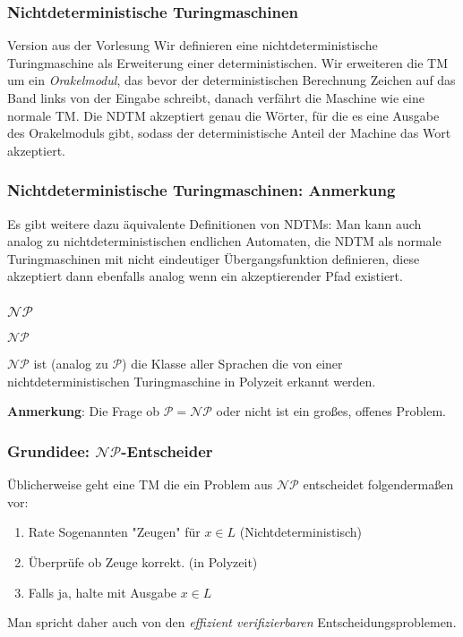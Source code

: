 \documentclass{beamer}
\begin{document}
\begin{frame}
\frametitle{Nichtdeterministische Turingmaschinen}

\begin{block}{Version aus der Vorlesung}
Wir definieren eine nichtdeterministische Turingmaschine als Erweiterung einer deterministischen.
 Wir erweiteren die TM um ein \emph{Orakelmodul}, das bevor der deterministischen Berechnung Zeichen auf das Band links von der Eingabe schreibt,
 danach verfährt die Maschine wie eine normale TM.
 Die NDTM akzeptiert genau die Wörter, für die es eine Ausgabe des Orakelmoduls gibt,
 sodass der deterministische Anteil der Machine das Wort akzeptiert.
\end{block}
\end{frame}
\begin{frame}
\frametitle{Nichtdeterministische Turingmaschinen: Anmerkung}
Es gibt weitere dazu äquivalente Definitionen von NDTMs:
 Man kann auch analog zu nichtdeterministischen endlichen Automaten, die NDTM als normale Turingmaschinen mit nicht eindeutiger Übergangsfunktion definieren,
 diese akzeptiert dann ebenfalls analog wenn ein akzeptierender Pfad existiert.\\
\end{frame}

\begin{frame}
\frametitle{$\mathcal{NP}$}
\begin{block}{$\mathcal{NP}$}

$\mathcal{NP}$ ist (analog zu $\mathcal{P}$) die Klasse aller Sprachen die von einer nichtdeterministischen Turingmaschine in Polyzeit erkannt werden.
\end{block}\vspace{1cm}
\textbf{Anmerkung}: Die Frage ob $\mathcal{P} = \mathcal{NP}$ oder nicht ist ein großes, offenes Problem.
\end{frame}

\begin{frame}
\frametitle{Grundidee: $\mathcal{NP}$-Entscheider}
Üblicherweise geht eine TM die ein Problem aus $\mathcal{NP}$ entscheidet folgendermaßen vor: 
\begin{enumerate}
\item Rate Sogenannten "Zeugen" für $x \in L$ (Nichtdeterministisch)
\item Überprüfe ob Zeuge korrekt. (in Polyzeit)
\item Falls ja, halte mit Ausgabe $x \in L$
\end{enumerate}
Man spricht daher auch von den \emph{effizient verifizierbaren} Entscheidungsproblemen.
\end{frame}
\end{document}
